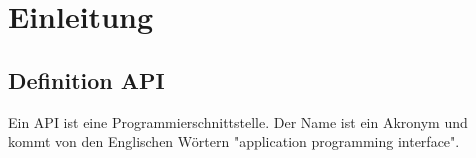 \chapter{Einleitung}

	\section{Definition API}
		Ein API ist eine Programmierschnittstelle. Der Name ist ein Akronym und kommt von den Englischen Wörtern "application programming interface".		
		